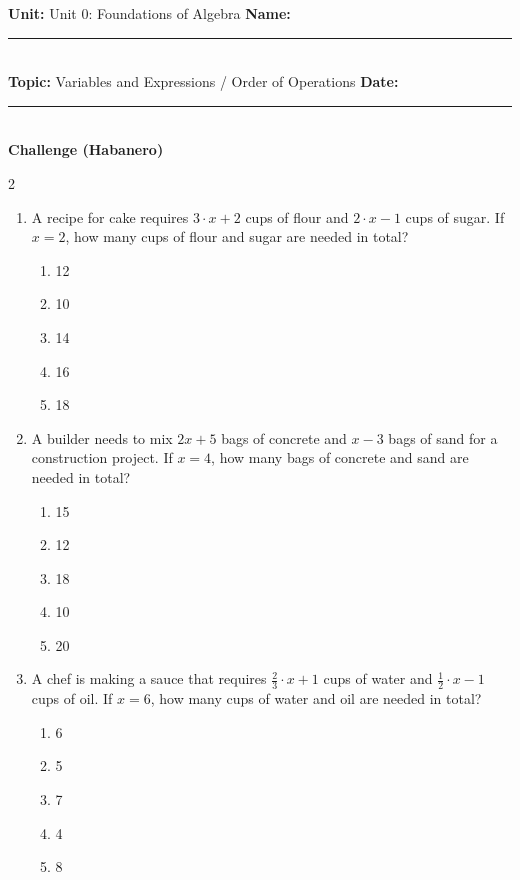 \documentclass[10pt]{article}
\begin{document}
\enlargethispage{2.5cm}

\begin{tcolorbox}[colback=mainblue!5, colframe=mainblue, sharp corners, boxrule=0.5pt]
    \small \textbf{Unit:} Unit 0: Foundations of Algebra \hfill \textbf{Name:} \rule{3cm}{0.4pt} \\
    \small \textbf{Topic:} Variables and Expressions / Order of Operations \hfill \textbf{Date:} \rule{2cm}{0.4pt} \\
    \centering \textbf{\large Challenge (Habanero)}
\end{tcolorbox}

\vspace{0.2cm}

\begin{multicols}{2}
\begin{enumerate}[label=\textbf{Q\arabic*.}, leftmargin=*, itemsep=6pt, parsep=0pt]

  \item \small A recipe for cake requires $3 \cdot x + 2$ cups of flour and $2 \cdot x - 1$ cups of sugar. If $x = 2$, how many cups of flour and sugar are needed in total?
  \begin{enumerate}[label=(\Alph*), leftmargin=0.6cm, nosep, itemsep=2pt]
    \item 12
    \item 10
    \item 14
    \item 16
    \item 18
  \end{enumerate}

  \item \small A builder needs to mix $2x + 5$ bags of concrete and $x - 3$ bags of sand for a construction project. If $x = 4$, how many bags of concrete and sand are needed in total?
  \begin{enumerate}[label=(\Alph*), leftmargin=0.6cm, nosep, itemsep=2pt]
    \item 15
    \item 12
    \item 18
    \item 10
    \item 20
  \end{enumerate}

  \item \small A chef is making a sauce that requires $\frac{2}{3} \cdot x + 1$ cups of water and $\frac{1}{2} \cdot x - 1$ cups of oil. If $x = 6$, how many cups of water and oil are needed in total?
  \begin{enumerate}[label=(\Alph*), leftmargin=0.6cm, nosep, itemsep=2pt]
    \item 6
    \item 5
    \item 7
    \item 4
    \item 8
  \end{enumerate}


\end{enumerate}
\end{multicols}
\end{document}
